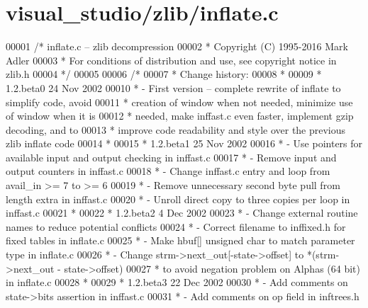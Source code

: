 \hypertarget{visual__studio_2zlib_2inflate_8c_source}{}\section{visual\+\_\+studio/zlib/inflate.c}
\label{visual__studio_2zlib_2inflate_8c_source}

\begin{DoxyCode}
00001 \textcolor{comment}{/* inflate.c -- zlib decompression}
00002 \textcolor{comment}{ * Copyright (C) 1995-2016 Mark Adler}
00003 \textcolor{comment}{ * For conditions of distribution and use, see copyright notice in zlib.h}
00004 \textcolor{comment}{ */}
00005 
00006 \textcolor{comment}{/*}
00007 \textcolor{comment}{ * Change history:}
00008 \textcolor{comment}{ *}
00009 \textcolor{comment}{ * 1.2.beta0    24 Nov 2002}
00010 \textcolor{comment}{ * - First version -- complete rewrite of inflate to simplify code, avoid}
00011 \textcolor{comment}{ *   creation of window when not needed, minimize use of window when it is}
00012 \textcolor{comment}{ *   needed, make inffast.c even faster, implement gzip decoding, and to}
00013 \textcolor{comment}{ *   improve code readability and style over the previous zlib inflate code}
00014 \textcolor{comment}{ *}
00015 \textcolor{comment}{ * 1.2.beta1    25 Nov 2002}
00016 \textcolor{comment}{ * - Use pointers for available input and output checking in inffast.c}
00017 \textcolor{comment}{ * - Remove input and output counters in inffast.c}
00018 \textcolor{comment}{ * - Change inffast.c entry and loop from avail\_in >= 7 to >= 6}
00019 \textcolor{comment}{ * - Remove unnecessary second byte pull from length extra in inffast.c}
00020 \textcolor{comment}{ * - Unroll direct copy to three copies per loop in inffast.c}
00021 \textcolor{comment}{ *}
00022 \textcolor{comment}{ * 1.2.beta2    4 Dec 2002}
00023 \textcolor{comment}{ * - Change external routine names to reduce potential conflicts}
00024 \textcolor{comment}{ * - Correct filename to inffixed.h for fixed tables in inflate.c}
00025 \textcolor{comment}{ * - Make hbuf[] unsigned char to match parameter type in inflate.c}
00026 \textcolor{comment}{ * - Change strm->next\_out[-state->offset] to *(strm->next\_out - state->offset)}
00027 \textcolor{comment}{ *   to avoid negation problem on Alphas (64 bit) in inflate.c}
00028 \textcolor{comment}{ *}
00029 \textcolor{comment}{ * 1.2.beta3    22 Dec 2002}
00030 \textcolor{comment}{ * - Add comments on state->bits assertion in inffast.c}
00031 \textcolor{comment}{ * - Add comments on op field in inftrees.h}

\end{DoxyCode}
